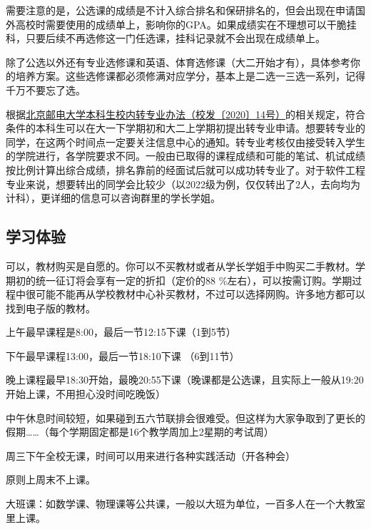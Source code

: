 需要注意的是，公选课的成绩是不计入综合排名和保研排名的，但会出现在申请国外高校时需要使用的成绩单上，影响你的GPA。如果成绩实在不理想可以干脆挂科，只要后续不再选修这一门任选课，挂科记录就不会出现在成绩单上。

除了公选以外还有专业选修课和英语、体育选修课（大二开始才有），具体参考你的培养方案。这些选修课都必须修满对应学分，基本上是二选一三选一系列，记得千万不要忘了选。


根据\href{http://my.bupt.edu.cn/content.jsp?urltype=news.NewsContentUrl&wbtreeid=1036&wbnewsid=25646}{北京邮电大学本科生校内转专业办法（校发〔2020〕14号）}的相关规定，符合条件的本科生可以在大一下学期初和大二上学期初提出转专业申请。想要转专业的同学，在这两个时间点一定要关注信息中心的通知。转专业考核仅由接受转入学生的学院进行，各学院要求不同。一般由已取得的课程成绩和可能的笔试、机试成绩按比例计算出综合成绩，排名靠前的经面试后就可以成功转专业了。对于软件工程专业来说，想要转出的同学会比较少（以2022级为例，仅仅转出了2人，去向均为计科），更详细的信息可以咨询群里的学长学姐。

\subsection{学习体验}


可以，教材购买是自愿的。你可以不买教材或者从学长学姐手中购买二手教材。学期初的统一征订将会享有一定的折扣（定价的88 \%左右），可以按需订购。学期过程中很可能不能再从学校教材中心补买教材，不过可以选择网购。许多地方都可以找到电子版的教材。


上午最早课程是8:00，最后一节12:15下课（1到5节）

下午最早课程13:00，最后一节18:10下课 （6到11节）

晚上课程最早18:30开始，最晚20:55下课（晚课都是公选课，且实际上一般从19:20开始上课，不用担心没时间吃晚饭）

中午休息时间较短，如果碰到五六节联排会很难受。但这样为大家争取到了更长的假期……（每个学期固定都是16个教学周加上2星期的考试周）

周三下午全校无课，时间可以用来进行各种实践活动（开各种会）

原则上周末不上课。


大班课：如数学课、物理课等公共课，一般以大班为单位，一百多人在一个大教室里上课。

